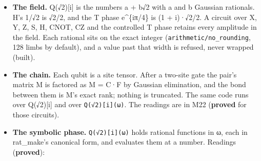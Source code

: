 \begin{itemize}
\item \textbf{The field.} Q(√2)[i] is the numbers a + b√2 with a and b Gaussian rationals. H's 1/√2 is √2/2, and the T phase e\textasciicircum{}\{iπ/4\} is (1 + i)·√2/2. A circuit over X, Y, Z, S, H, CNOT, CZ and the controlled T phase retains every amplitude in the field. Each rational sits on the exact integer (\texttt{arithmetic/\allowbreak{}no\_\allowbreak{}rounding}, 128 limbs by default), and a value past that width is refused, never wrapped (built).
\item \textbf{The chain.} Each qubit is a site tensor. After a two-site gate the pair's matrix M is factored as M = C·F by Gaussian elimination, and the bond between them is M's exact rank; nothing is truncated. The same code runs over Q(√2)[i] and over \texttt{Q(√2)[i](ω)}. The readings are in M22 (\textbf{proved} for those circuits).
\item \textbf{The symbolic phase.} \texttt{Q(√2)[i](ω)} holds rational functions in ω, each in rat\_\allowbreak{}make's canonical form, and evaluates them at a number. Readings (\textbf{proved}):


\end{itemize}
